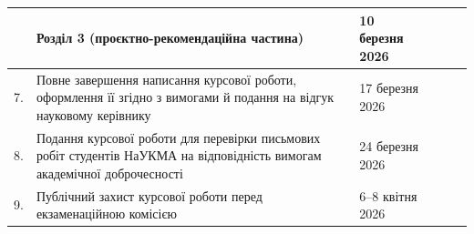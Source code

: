 \begin{landscape}
\begin{center}
\begin{singlespace}
\begin{tabular}{|c|p{14cm}|p{3cm}|p{2.5cm}|p{2cm}|p{2.25cm}|}
        \hline
        & \textbf{Розділ 3}\newline
        (проєктно-рекомендаційна частина) &
        10 березня 2026 & & & \\
        \hline
        7. & Повне завершення написання курсової роботи, оформлення її згідно з вимогами й подання на відгук науковому керівнику &
        17 березня 2026 & & & \\
        \hline
        8. & Подання курсової роботи для перевірки письмових робіт студентів НаУКМА на відповідність вимогам академічної доброчесності &
        24 березня 2026 & & & \\
        \hline
        9. & Публічний захист курсової роботи перед екзаменаційною комісією &
        6–8 квітня 2026 & & & \\
        \hline
    \end{tabular}\\[1em]
    \begin{flushleft}\end{flushleft}
    \end{singlespace}
\end{center}
\end{landscape}
\clearpage
\restoregeometry
\newpage